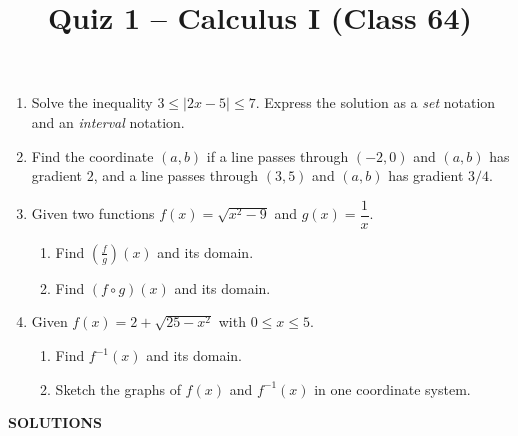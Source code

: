 \documentclass[12pt,a4paper]{article}
\title{\textbf{Quiz 1 -- Calculus I (Class 64)}}
\author{}
\date{}
\newcommand{\ds}{\displaystyle}
\begin{document}
\maketitle


\begin{enumerate}

  \item Solve the inequality $3 \le |2x - 5| \le 7$.
        Express the solution as a \emph{set} notation and an \emph{interval} notation.

  \item Find the coordinate $(a, b)$ if a line passes through $(-2, 0)$ and
        $(a, b)$ has gradient $2$, and a line passes through $(3, 5)$ and
        $(a, b)$ has gradient $3/4$.

  \item Given two functions $\ds f(x) = \sqrt{x^2 - 9}$ and $\ds g(x) = \dfrac{1}{x}$.
        \begin{enumerate}
          \item Find $\ds\left(\frac{f}{g}\right)(x)$ and its domain.
          \item Find $(f \circ g)(x)$ and its domain.
        \end{enumerate}

  \item Given $f(x) = 2 + \sqrt{25 - x^2}$ with $0 \le x \le 5$.
        \begin{enumerate}
          \item Find $f^{-1}(x)$ and its domain.
          \item Sketch the graphs of $f(x)$ and $f^{-1}(x)$ in one coordinate system.
        \end{enumerate}

\end{enumerate}

\newpage


\begin{center}
  \textbf{\Large SOLUTIONS}\\[1cm]
\end{center}
\end{document}

